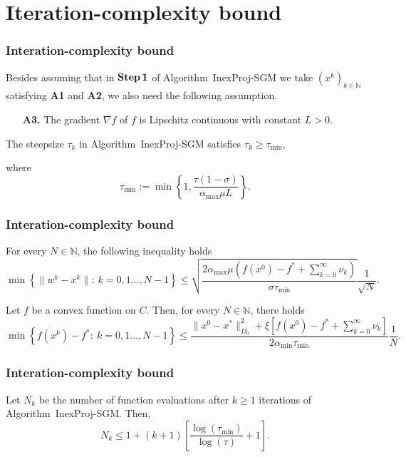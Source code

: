 \section{Iteration-complexity bound}


\begin{frame}[t]\frametitle{Interation-complexity bound}
    Besides  assuming   that  in ${\bf Step\,1}$ of  Algorithm~InexProj-SGM we take   $(x^k)_{k\in\mathbb{N}}$ satisfying {\bf A1} and {\bf A2},  we also need the following assumption.
\begin{itemize}
  \item[{\bf A3.}] The  gradient $\nabla f$ of $f$ is  Lipschitz continuous with constant $L>0$.
\end{itemize}


\begin{lemma}
  The steepsize $\tau_k$ in Algorithm~InexProj-SGM satisfies $\tau_k \geq \tau_{\min}$,
\end{lemma}
where 
\begin{equation*}
  \tau_{\min} := \min \left\{1, \frac{\tau(1-\sigma)}{{\alpha_{\max}}\mu L}\right\}.
\end{equation*}
\end{frame}


\begin{frame}[t]\frametitle{Interation-complexity bound}
\begin{theorem} 
  For every $N \in \mathbb{N}$, the following inequality holds
  $$
    \min\left\{\|w^k-x^k\| :~ k= 0, 1 \ldots, N-1\right\} \leq \sqrt{\frac{2{\alpha_{\max}}\mu\left(f(x^0)-f^* +\sum_{k= 0}^{\infty}\nu_k\right) }{\sigma \tau_{\min}}} \frac{1}{\sqrt{N}}.
  $$
\end{theorem}

\begin{theorem} 
  Let $f$ be a convex function on $C$. Then, for every $N \in \mathbb{N}$, there holds
  $$
    \min \left\{f(x^k) - f^* :~k = 0, 1 \ldots, N-1\right\} \leq \frac{\|x^0 - x^*\|^2_{D_0} + \xi\left[f(x^0)-f^*+ \sum_{k=0}^{\infty} \nu_k\right]}{2 \alpha_{\min} \tau_{\min}}\frac{1}{N}.
  $$
\end{theorem}
\end{frame}

\begin{frame}[c]\frametitle{Interation-complexity bound}
  \begin{lemma} 
  Let $N_{k}$ be  the number of function evaluations after $k\geq 1$ iterations of Algorithm~InexProj-SGM. Then,  
  \[N_{k}\leq 1+ (k+1)\left[\frac{\log (\tau_{\min})}{\log(\tau)}+1 \right].\]
\end{lemma}
\end{frame}


